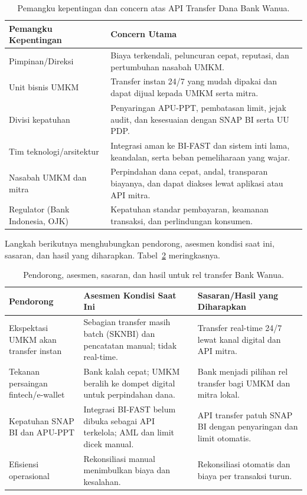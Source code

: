 \begin{table}[htbp]
\centering
\scriptsize
\caption{Pemangku kepentingan dan concern atas API Transfer Dana Bank Wanua.}
\label{tab:bank-wanua-bmc}
\begin{tabularx}{\textwidth}{@{}p{} X@{}}
\hline
\textbf{Pemangku Kepentingan} & \textbf{Concern Utama} \\
\hline
Pimpinan/Direksi & Biaya terkendali, peluncuran cepat, reputasi, dan
pertumbuhan nasabah UMKM. \\
Unit bisnis UMKM & Transfer instan 24/7 yang mudah dipakai dan dapat dijual
kepada UMKM serta mitra. \\
Divisi kepatuhan & Penyaringan APU-PPT, pembatasan limit, jejak audit, dan
kesesuaian dengan SNAP BI serta UU PDP. \\
Tim teknologi/arsitektur & Integrasi aman ke BI-FAST dan sistem inti lama,
keandalan, serta beban pemeliharaan yang wajar. \\
Nasabah UMKM dan mitra & Perpindahan dana cepat, andal, transparan biayanya,
dan dapat diakses lewat aplikasi atau API mitra. \\
Regulator (Bank Indonesia, OJK) & Kepatuhan standar pembayaran, keamanan
transaksi, dan perlindungan konsumen. \\
\hline
\end{tabularx}
\end{table}

Langkah berikutnya menghubungkan pendorong, asesmen kondisi saat ini, sasaran,
dan hasil yang diharapkan. Tabel~\ref{tab:bank-wanua-motivasi} meringkasnya.

\begin{table}[htbp]
\centering
\scriptsize
\caption{Pendorong, asesmen, sasaran, dan hasil untuk rel transfer Bank Wanua.}
\label{tab:bank-wanua-motivasi}
\begin{tabularx}{\textwidth}{@{}p{} X X@{}}
\hline
\textbf{Pendorong} & \textbf{Asesmen Kondisi Saat Ini} & \textbf{Sasaran/Hasil yang Diharapkan} \\
\hline
Ekspektasi UMKM akan transfer instan & Sebagian transfer masih batch (SKNBI)
dan pencatatan manual; tidak real-time. & Transfer real-time 24/7 lewat kanal
digital dan API mitra. \\
Tekanan persaingan fintech/e-wallet & Bank kalah cepat; UMKM beralih ke dompet
digital untuk perpindahan dana. & Bank menjadi pilihan rel transfer bagi UMKM
dan mitra lokal. \\
Kepatuhan SNAP BI dan APU-PPT & Integrasi BI-FAST belum dibuka sebagai API
terkelola; AML dan limit dicek manual. & API transfer patuh SNAP BI dengan
penyaringan dan limit otomatis. \\
Efisiensi operasional & Rekonsiliasi manual menimbulkan biaya dan kesalahan. &
Rekonsiliasi otomatis dan biaya per transaksi turun. \\
\hline
\end{tabularx}
\end{table}

